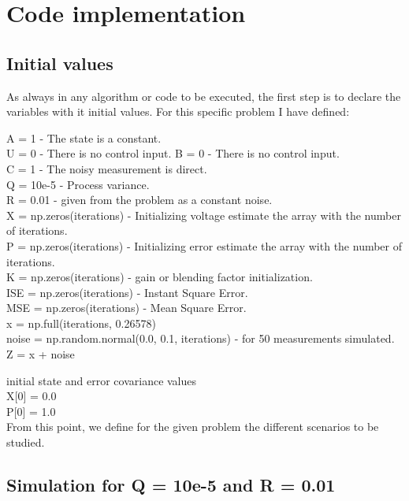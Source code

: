 \documentclass{article}
\begin{document}
    \section{Code implementation}

    \subsection{Initial values}
        
    As always in any algorithm or code  to be executed, the first step is to declare the variables with it initial values.
    For this specific problem I have defined:

    A = 1 - The state is a constant. \\
    U = 0 - There is no control input.
    B = 0 - There is no control input. \\
    C = 1 - The noisy measurement is direct. \\
    Q = 10e-5 - Process variance. \\
    R = 0.01 - given from the problem as a constant noise. \\
    X = np.zeros(iterations)  - Initializing voltage estimate the array with the number of iterations.  \\
    P = np.zeros(iterations) - Initializing error estimate the array with the number of iterations. \\
    K = np.zeros(iterations) - gain or blending factor initialization.\\
    ISE = np.zeros(iterations) - Instant Square Error. \\
    MSE = np.zeros(iterations) - Mean Square Error. \\
    x = np.full(iterations, 0.26578) \\
    noise = np.random.normal(0.0, 0.1, iterations) - for 50 measurements simulated. \\
    Z = x + noise

    initial state and error covariance values \\
    X[0] = 0.0 \\
    P[0] = 1.0 \\

    From this point, we define for the given problem the different scenarios to be studied.
    
    \subsection{Simulation for Q = 10e-5 and R = 0.01}
\end{document}
